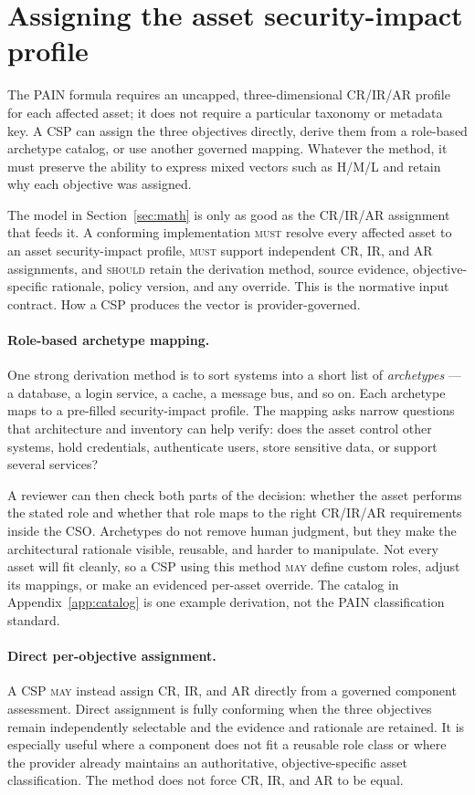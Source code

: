 \documentclass[11pt]{article}
\newcommand{\rfckw}[1]{\textsc{#1}}
\begin{document}
\section{Assigning the asset security-impact profile}
\label{sec:archetypes}
\begin{plain}
The PAIN formula requires an uncapped, three-dimensional CR/IR/AR profile for each
affected asset; it does not require a particular taxonomy or metadata key. A CSP
can assign the three objectives directly, derive them from a role-based archetype
catalog, or use another governed mapping. Whatever the method, it must preserve the
ability to express mixed vectors such as H/M/L and retain why each objective was
assigned.
\end{plain}
The model in Section~\ref{sec:math} is only as good as the CR/IR/AR assignment that
feeds it. A conforming implementation \rfckw{must} resolve every affected asset to
an asset security-impact profile, \rfckw{must} support independent CR, IR, and AR
assignments, and \rfckw{should} retain the derivation method, source evidence,
objective-specific rationale, policy version, and any override. This is the
normative input contract. How a CSP produces the vector is provider-governed.

\paragraph{Role-based archetype mapping.}
One strong derivation method is to sort systems into a short list of
\emph{archetypes} --- a database, a login service, a cache, a message bus, and so
on. Each archetype maps to a pre-filled security-impact profile. The mapping asks
narrow questions that architecture and inventory can help verify: does the asset
control other systems, hold credentials, authenticate users, store sensitive data,
or support several services?

A reviewer can then check both parts of the decision: whether the asset performs
the stated role and whether that role maps to the right CR/IR/AR requirements
inside the CSO. Archetypes do not remove human judgment, but they make the
architectural rationale visible, reusable, and harder to manipulate. Not every
asset will fit cleanly, so a CSP using this method \rfckw{may} define custom roles,
adjust its mappings, or make an evidenced per-asset override. The catalog in
Appendix~\ref{app:catalog} is one example derivation, not the PAIN classification
standard.

\paragraph{Direct per-objective assignment.}
A CSP \rfckw{may} instead assign CR, IR, and AR directly from a governed component
assessment. Direct assignment is fully conforming when the three objectives remain
independently selectable and the evidence and rationale are retained. It is
especially useful where a component does not fit a reusable role class or where
the provider already maintains an authoritative, objective-specific asset
classification. The method does not force CR, IR, and AR to be equal.
\end{document}
